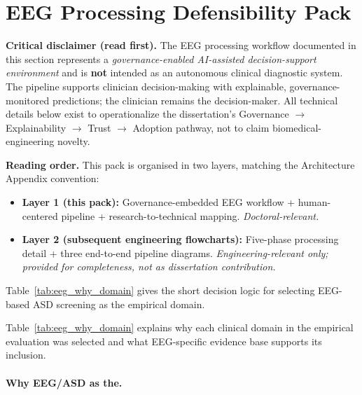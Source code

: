 \section*{EEG Processing Defensibility Pack}
\label{sec:eeg_defensibility_pack}

\noindent\textbf{Critical disclaimer (read first).} The EEG processing workflow documented in this section represents a \emph{governance-enabled AI-assisted decision-support environment} and is \textbf{not} intended as an autonomous clinical diagnostic system. The pipeline supports clinician decision-making with explainable, governance-monitored predictions; the clinician remains the decision-maker. All technical details below exist to operationalize the dissertation's Governance $\to$ Explainability $\to$ Trust $\to$ Adoption pathway, not to claim biomedical-engineering novelty.

\noindent\textbf{Reading order.} This pack is organised in two layers, matching the Architecture Appendix convention:
\begin{itemize}[leftmargin=*, itemsep=2pt]
    \item \textbf{Layer 1 (this pack):} Governance-embedded EEG workflow + human-centered pipeline + research-to-technical mapping. \emph{Doctoral-relevant.}
    \item \textbf{Layer 2 (subsequent engineering flowcharts):} Five-phase processing detail + three end-to-end pipeline diagrams. \emph{Engineering-relevant only; provided for completeness, not as dissertation contribution.}
\end{itemize}

\noindent Table~\ref{tab:eeg_why_domain} gives the short decision logic for selecting EEG-based ASD screening as the empirical domain.

\noindent Table~\ref{tab:eeg_why_domain} explains why each clinical domain in the empirical evaluation was selected and what EEG-specific evidence base supports its inclusion.

\paragraph{Why EEG/ASD as the.}




